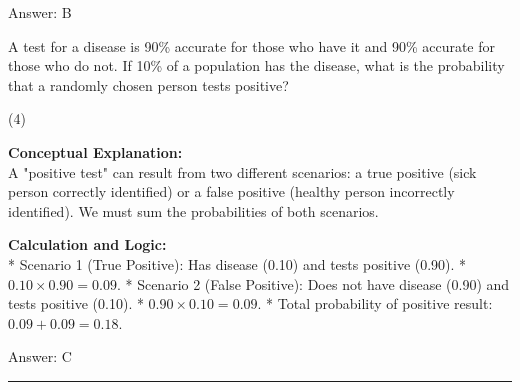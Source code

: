 \documentclass[11pt,paper=a4,answers]{exam}
\begin{document}
\begin{questions}
\begin{solution}
\vspace{30pt}

Answer: \colorbox{yellow!100}{B}
\end{solution}

\vspace{60pt}

\question
A test for a disease is 90\% accurate for those who have it and 90\% accurate for those who do not. If 10\% of a population has the disease, what is the probability that a randomly chosen person tests positive?
\begin{tasks}(4)
\end{tasks}

\begin{solution}
\textbf{Conceptual Explanation:} \\
A "positive test" can result from two different scenarios: a true positive (sick person correctly identified) or a false positive (healthy person incorrectly identified). We must sum the probabilities of both scenarios.

\vspace{30pt}

\textbf{Calculation and Logic:} \\
* Scenario 1 (True Positive): Has disease (0.10) and tests positive (0.90).
* $0.10 \times 0.90 = 0.09$.
* Scenario 2 (False Positive): Does not have disease (0.90) and tests positive (0.10).
* $0.90 \times 0.10 = 0.09$.
* Total probability of positive result: $0.09 + 0.09 = 0.18$.

\vspace{30pt}

Answer: \colorbox{yellow!100}{C}
\end{solution}


\end{questions}
\begin{center}
\rule{.5\textwidth}{1pt}
\end{center}
\end{document}
